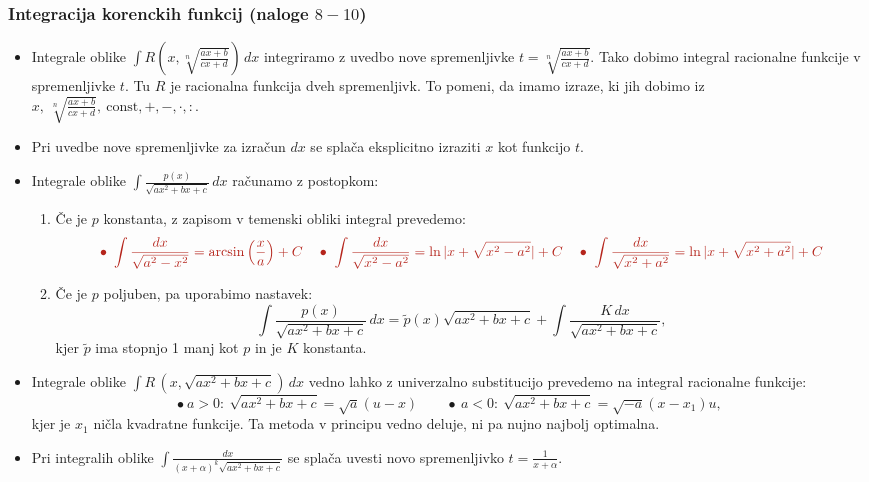 {\color{Purple} \subsubsection*{Integracija korenckih funkcij (naloge $8-10$)}}
\begin{itemize}
    \item Integrale oblike $\displaystyle \int R(x, \sqrt[n]{\frac{ax+b}{cx+d}}) \, dx$ integriramo z uvedbo nove spremenljivke $t = \sqrt[n]{\frac{ax+b}{cx+d}}$. Tako dobimo integral racionalne funkcije v spremenljivke $t$. Tu $R$ je racionalna funkcija dveh spremenljivk. To pomeni, da imamo izraze, ki jih dobimo iz $x, \ \sqrt[n]{\frac{ax+b}{cx+d}}, \ \text{const}, +, -, \cdot, :$. 
    \item Pri uvedbe nove spremenljivke za izračun $dx$ se splača eksplicitno izraziti $x$ kot funkcijo $t$.
    \item Integrale oblike $\displaystyle \int \frac{p(x)}{\sqrt{ax^2+bx+c}} \, dx$ računamo z postopkom:
    \begin{enumerate}
        \item Če je $p$ konstanta, z zapisom v temenski obliki integral prevedemo:
        $$
        \color{BrickRed}
        \bullet \ \int \frac{dx}{\sqrt{a^2-x^2}} = \arcsin \left(\frac{x}{a}\right) + C \quad 
        \bullet \ \int \frac{dx}{\sqrt{x^2 - a^2}} = \ln |x + \sqrt{x^2-a^2}| + C \quad 
        \bullet \ \int \frac{dx}{\sqrt{x^2 + a^2}} = \ln|x+\sqrt{x^2+a^2}| + C $$
        \item Če je $p$ poljuben, pa uporabimo nastavek:
        $$\displaystyle \int \frac{p(x)}{\sqrt{ax^2+bx+c}} \, dx = \widetilde{p}(x) \sqrt{ax^2+bx+c} + \int \frac{K \, dx}{\sqrt{ax^2+bx+c}},$$
        kjer $\widetilde{p}$ ima stopnjo 1 manj kot $p$ in je $K$ konstanta.
    \end{enumerate}
    \item Integrale oblike $\displaystyle \int R \, (x, \sqrt{ax^2+bx+c}) \, dx$ vedno lahko z univerzalno substitucijo prevedemo na integral racionalne funkcije:
    $$\bullet \ a>0: \ \sqrt{ax^2+bx+c} = \sqrt{a}(u-x) \qquad \bullet \ a<0: \ \sqrt{ax^2+bx+c} = \sqrt{-a}(x-x_1)u,$$
    kjer je $x_1$ ničla kvadratne funkcije. Ta metoda v principu vedno deluje, ni pa nujno najbolj optimalna.
    \item Pri integralih oblike $\displaystyle \int \frac{dx}{(x+\alpha)^k \sqrt{ax^2+bx+c}}$ se splača uvesti novo spremenljivko $t = \frac{1}{x+\alpha}$.
\end{itemize}

